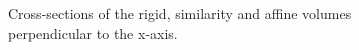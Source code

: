 	\begin{figure}[htbp]
	  \centering
	  \caption{Cross-sections of the rigid, similarity and affine volumes perpendicular to the x-axis.}
	  \label{fig:hires_0_235}
	\end{figure}

